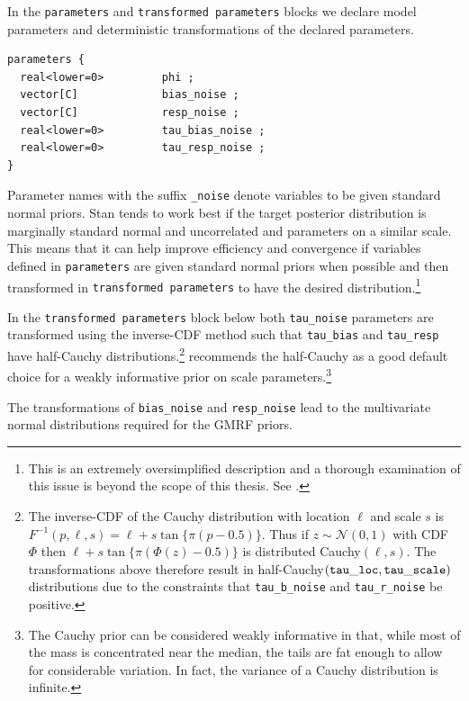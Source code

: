 In the {\tt parameters} and {\tt transformed parameters} blocks we declare model parameters and deterministic transformations of the declared parameters. 

\begin{singlespacing}
\small
\begin{verbatim}
parameters {
  real<lower=0>         phi ;
  vector[C]             bias_noise ;
  vector[C]             resp_noise ;
  real<lower=0>         tau_bias_noise ;
  real<lower=0>         tau_resp_noise ;
}
\end{verbatim}
\end{singlespacing}


\noindent Parameter names with the suffix {\tt \_noise} denote variables to be given standard normal priors. Stan tends to work best if the target posterior distribution is marginally standard normal and uncorrelated and parameters on a  similar scale. This means that it can help improve efficiency and convergence if variables defined in {\tt parameters} are given standard normal priors when possible and then transformed in {\tt transformed parameters} to have the desired distribution.\footnote{This is an extremely oversimplified description and a thorough examination of this issue is beyond the scope of this thesis. See .} 

In the {\tt transformed parameters} block below both {\tt tau\_noise} parameters are transformed using the inverse-CDF method such that {\tt tau\_bias} and {\tt tau\_resp} have half-Cauchy distributions.\footnote{The inverse-CDF of the Cauchy distribution with location $\ell$ and scale $s$ is $F^{-1}(p, \ell,s)  = \ell + s \tan{\{ \pi (p - 0.5)\}}$. Thus if $z \sim \mathcal{N}(0,1)$ with CDF $\Phi$ then $\ell + s \tan{\{ \pi (\Phi(z) - 0.5)\}}$ is distributed Cauchy$(\ell, s)$. The transformations above therefore result in half-Cauchy$({\tt tau\_loc}, {\tt tau\_scale})$ distributions due to the constraints that {\tt tau\_b\_noise} and {\tt tau\_r\_noise} be positive.}  recommends the half-Cauchy as a good default choice for a weakly informative prior on scale parameters.\footnote{The Cauchy prior can be considered weakly informative in that, while most of the mass is concentrated near the median, the tails are fat enough to allow for considerable variation. In fact, the variance of a Cauchy distribution is infinite.}

The transformations of {\tt bias\_noise} and {\tt resp\_noise} lead to the multivariate normal distributions required for the GMRF priors. 

